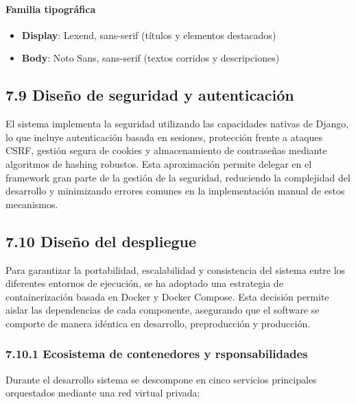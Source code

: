 \paragraph*{Familia tipográfica}

\begin{itemize}
\item \textbf{Display}: Lexend, sans-serif (títulos y elementos destacados)
\item \textbf{Body}: Noto Sans, sans-serif (textos corridos y descripciones)
\end{itemize}

\subsection{7.9 Diseño de seguridad y autenticación}
El sistema implementa la seguridad utilizando las capacidades nativas de Django,
lo que incluye autenticación basada en sesiones, protección frente a ataques
CSRF, gestión segura de cookies y almacenamiento de contraseñas mediante
algoritmos de hashing robustos. Esta aproximación permite delegar en el
framework gran parte de la gestión de la seguridad, reduciendo la complejidad
del desarrollo y minimizando errores comunes en la implementación manual de
estos mecanismos.

\subsection{7.10 Diseño del despliegue}
Para garantizar la portabilidad, escalabilidad y consistencia del sistema entre
los diferentes entornos de ejecución, se ha adoptado una estrategia de
containerización basada en Docker y Docker Compose. Esta decisión permite aislar
las dependencias de cada componente, asegurando que el software se comporte de
manera idéntica en desarrollo, preproducción y producción.

\subsubsection{7.10.1 Ecosistema de contenedores y rsponsabilidades}

Durante el desarrollo sistema se descompone en cinco servicios principales orquestados mediante una
red virtual privada:

